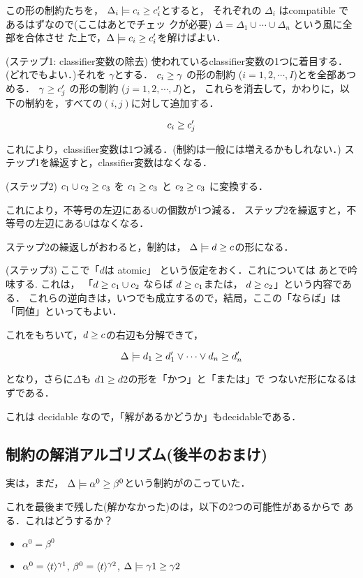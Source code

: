\documentclass[dvipdfmx]{jsarticle}
\newcommand\longer[2]{{#1} \ord {#2}}
\newcommand\uni{\cup} %
\begin{document}
この形の制約たちを，
$\Delta_i \models \longer{c_i}{c'_i}$とすると，
それぞれの $\Delta_i$ はcompatible であるはずなので(ここはあとでチェッ
クが必要)
$\Delta = \Delta_1 \cup \cdots \cup \Delta_n$ という風に全部を合体させ
た上で，$\Delta \models \longer{c_i}{c'_i}$を解けばよい．

(ステップ1: classifier変数の除去)
使われているclassifier変数の1つに着目する．(どれでもよい．)それを
$\gamma$とする．
$\longer{c_i}{\gamma}$ の形の制約 ($i=1,2,\cdots,I$)とを全部あつめる．
$\longer{\gamma}{c'_j}$ の形の制約 ($j=1,2,\cdots,J$)と，
これらを消去して，かわりに，以下の制約を，すべての$(i,j)$に対して追加する．

\[
  \longer{c_i}{c'_j}
\]

これにより，classifier変数は1つ減る．(制約は一般には増えるかもしれない．)
ステップ1を繰返すと，classifier変数はなくなる．

(ステップ2) $\longer{c_1 \uni c_2}{c_3}$ を
$\longer{c_1}{c_3}$ と
$\longer{c_2}{c_3}$ に変換する．

これにより，不等号の左辺にある$\uni$の個数が1つ減る．
ステップ2を繰返すと，不等号の左辺にある$\uni$はなくなる．

ステップ2の繰返しがおわると，制約は，
$\Delta \models \longer{d}{c}$の形になる．

(ステップ3) ここで「$d$は atomic」 という仮定をおく．これについては
あとで吟味する.
これは，
「$\longer{d}{c_1 \uni c_2}$ ならば
$\longer{d}{c_1}$または，
$\longer{d}{c_2}$」という内容である．
これらの逆向きは，いつでも成立するので，結局，ここの「ならば」は「同値」といってもよい．

これをもちいて，$\longer{d}{c}$の右辺も分解できて，

\[
  \Delta \models \longer{d_1}{d_1'} \vee \cdots \vee \longer{d_n}{d'_n}
\]

となり，さらに$\Delta$も $\longer{d1}{d2}$の形を「かつ」と「または」で
つないだ形になるはずである．

これは decidable なので，「解があるかどうか」もdecidableである．

\subsection{制約の解消アルゴリズム(後半のおまけ)}

実は，まだ，
$\Delta \models \longer{\alpha^0}{\beta^0}$という制約がのこっていた．

これを最後まで残した(解かなかった)のは，以下の2つの可能性があるからで
ある．これはどうするか？

\begin{itemize}
\item $\alpha^0 = \beta^0$
\item
  $\alpha^0 = \langle{t}\rangle^{\gamma1}$,
  $\beta^0 = \langle{t}\rangle^{\gamma2}$,
  $\Delta \models \longer{\gamma1}{\gamma2}$
\end{itemize}
\end{document}
